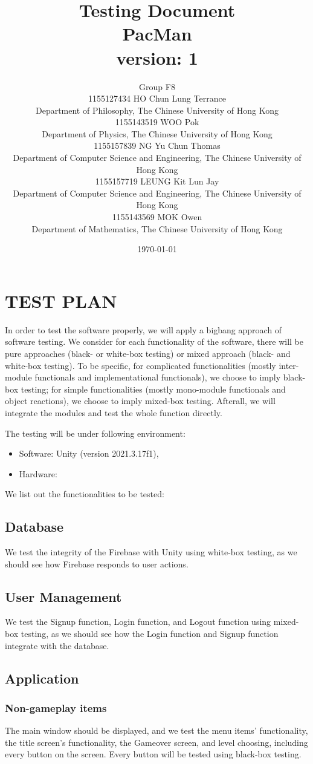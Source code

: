 \documentclass[11pt]{article}
\title{Testing Document\\PacMan\\version: 1}
\author{Group F8\\1155127434 HO Chun Lung Terrance\\
Department of Philosophy, The Chinese University of Hong Kong\\1155143519 WOO Pok\\
Department of Physics, The Chinese University of Hong Kong\\1155157839 NG Yu Chun Thomas\\
Department of Computer Science and Engineering, The Chinese University of Hong Kong\\1155157719 LEUNG Kit Lun Jay\\
Department of Computer Science and Engineering, The Chinese University of Hong Kong\\1155143569 MOK Owen\\
Department of Mathematics, The Chinese University of Hong Kong}
\date{\today}
\begin{document}
    \maketitle
    \tableofcontents
    \newpage

    \section{TEST PLAN}
    In order to test the software properly, we will apply a bigbang approach of software testing. We consider for each functionality of the software, there will be pure approaches (black- or white-box testing) or mixed approach (black- and white-box testing). To be specific, for complicated functionalities (mostly inter-module functionals and implementational functionals), we choose to imply black-box testing; for simple functionalities (mostly mono-module functionals and object reactions), we choose to imply mixed-box testing. Afterall, we will integrate the modules and test the whole function directly.

    The testing will be under following environment:
    \begin{itemize}
        \item Software: Unity (version 2021.3.17f1),
        \item Hardware: 
    \end{itemize}

    We list out the functionalities to be tested:

    \subsection*{Database}
    We test the integrity of the Firebase with Unity using white-box testing, as we should see how Firebase responds to user actions.

    \subsection*{User Management}
    We test the Signup function, Login function, and Logout function using mixed-box testing, as we should see how the Login function and Signup function integrate with the database.

    \subsection*{Application}
    \subsubsection*{Non-gameplay items}
    The main window should be displayed, and we test the menu items' functionality, the title screen's functionality, the Gameover screen, and level choosing, including every button on the screen. Every button will be tested using black-box testing.
\end{document}
